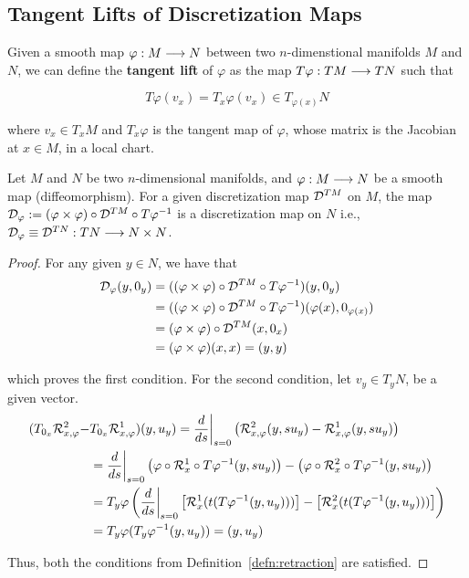 \subsection{Tangent Lifts of Discretization Maps}

Given a smooth map $\varphi: M \longrightarrow N$ between two $n$-dimenstional manifolds $M$ and $N$, we can define the \textbf{tangent lift} of $\varphi$ as the map $T\varphi: TM \longrightarrow TN$ such that

\[
  T\varphi(v_x) = T_x \varphi(v_x) \in T_{\varphi(x)} N
\]

where $v_x \in T_x M$ and $T_x\varphi$ is the tangent map of $\varphi$, whose matrix is the Jacobian at $x \in M$, in a local chart.

\begin{prop}
Let $M$ and $N$ be two $n$-dimensional manifolds, and $\varphi: M \longrightarrow N$ be a smooth map (diffeomorphism). For a given discretization map $\mathcal{D}^{TM}$ on $M$, the map $\mathcal{D}_{\varphi} :=  (\varphi \times \varphi) \circ \mathcal{D}^{TM} \circ T \varphi ^{-1}$ is a discretization map on $N$ i.e., $\mathcal{D}_{\varphi} \equiv \mathcal{D}^{TN} : TN \longrightarrow N \times N$.
\end{prop}


\begin{proof}
  For any given $y \in N$, we have that 
  \begin{equation*}
    \begin{split}
      \mathcal{D}_{\varphi} (y, 0_y) &= ((\varphi \times \varphi) \circ \mathcal{D}^{TM} \circ T\varphi^{-1}) (y, 0_y) \\
      &= ((\varphi \times \varphi) \circ \mathcal{D}^{TM} \circ T\varphi^{-1}) (\varphi(x), 0_{\varphi(x)}) \\
      &= (\varphi \times \varphi) \circ \mathcal{D}^{TM} (x, 0_x) \\ 
      &= (\varphi \times \varphi) (x, x) = (y, y)
    \end{split}
  \end{equation*}

  which proves the first condition. For the second condition, let $v_y \in T_y N$, be a given vector.
  \begin{equation*}
    \begin{split}
      (T_{0_x} \mathcal{R}_{x, \varphi}^2 - & T_{0_x} \mathcal{R}_{x, \varphi}^1 )(y, u_y) = \dfrac{d}{ds} \bigg{|}_{s=0} \left( \mathcal{R}_{x, \varphi}^2 (y, su_y) - \mathcal{R}_{x, \varphi}^1 (y, su_y) \right) \\
      &= \dfrac{d}{ds} \bigg{|}_{s=0} \left(\varphi \circ \mathcal{R}^1_x \circ T\varphi^{-1} (y, su_y) \right) -  \left( \varphi \circ \mathcal{R}^2_x \circ T \varphi^{-1}(y, su_y) \right) \\
      &= T_y \varphi \left( \dfrac{d}{ds} \bigg{|}_{s=0} \left[ \mathcal{R}^1_x(t(T\varphi^{-1} (y, u_y))) \right] - \left[ \mathcal{R}^2_x(t(T\varphi^{-1} (y, u_y))) \right] \right) \\
      &= T_y \varphi (T_y \varphi^{-1} (y, u_y)) = (y, u_y)
    \end{split}
  \end{equation*}

Thus, both the conditions from Definition~\ref{defn:retraction} are satisfied.
\end{proof}

